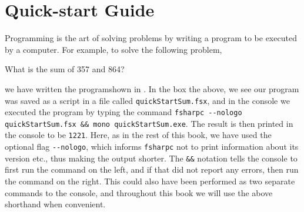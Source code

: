 \chapter{Quick-start Guide}
Programming is the art of solving problems by writing a program to be executed by a computer. For example, to solve the following problem,
%
\begin{problem}
  What is the sum of 357 and 864?
  \label{probl:sumInteger}
\end{problem}
%
we have written the programshown in .
%
%
In the box the above, we see our program was saved as a script in a file called \lstinline[language=console]{quickStartSum.fsx}, and in the console we executed the program by typing the command \lstinline[language=console]|fsharpc --nologo quickStartSum.fsx && mono quickStartSum.exe|. The result is then printed in the console to be \lstinline{1221}. Here, as in the rest of this book, we have used the optional flag \lstinline[language=console]{--nologo}, which informs \lstinline|fsharpc| not to print information about its version etc., thus making the output shorter. The \lstinline[language=console]{&&} notation tells the console to first run the command on the left, and if that did not report any errors, then run the command on the right. This could also have been performed as two separate commands to the console, and throughout this book we will use the above shorthand when convenient.

